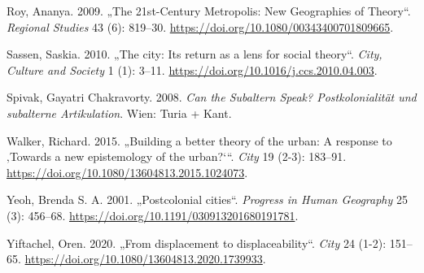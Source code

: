 \documentclass[
  ngerman,
]{article}
\newlength{\cslhangindent}
\newlength{\cslentryspacingunit} %
\newenvironment{CSLReferences}[2] %
 {%
  \setlength{\parindent}{0pt}
  \ifodd #1
  \let\oldpar\par
  \def\par{\hangindent=\cslhangindent\oldpar}
  \fi
  \setlength{\parskip}{#2\cslentryspacingunit}
 }%
 {}
\begin{document}
\begin{CSLReferences}{1}{0}
\leavevmode{}%
Roy, Ananya. 2009. {„The 21st-Century Metropolis: New Geographies of Theory``}. \emph{Regional Studies} 43 (6): 819--30. \url{https://doi.org/10.1080/00343400701809665}.

\leavevmode{}%
Sassen, Saskia. 2010. {„The city: Its return as a lens for social theory``}. \emph{City, Culture and Society} 1 (1): 3--11. \url{https://doi.org/10.1016/j.ccs.2010.04.003}.

\leavevmode{}%
Spivak, Gayatri Chakravorty. 2008. \emph{Can the Subaltern Speak? Postkolonialit{ä}t und subalterne Artikulation}. Wien: Turia + Kant.

\leavevmode{}%
Walker, Richard. 2015. {„Building a better theory of the urban: A response to {‚Towards a new epistemology of the urban?`}``}. \emph{City} 19 (2-3): 183--91. \url{https://doi.org/10.1080/13604813.2015.1024073}.

\leavevmode{}%
Yeoh, Brenda S. A. 2001. {„Postcolonial cities``}. \emph{Progress in Human Geography} 25 (3): 456--68. \url{https://doi.org/10.1191/030913201680191781}.

\leavevmode{}%
Yiftachel, Oren. 2020. {„From displacement to displaceability``}. \emph{City} 24 (1-2): 151--65. \url{https://doi.org/10.1080/13604813.2020.1739933}.

\end{CSLReferences}
\end{document}
